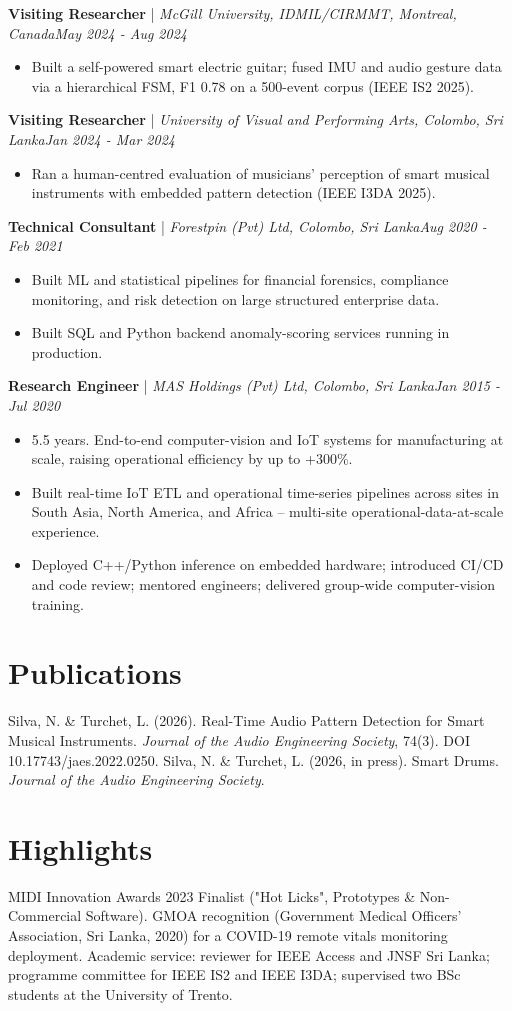 \documentclass[11pt]{article}
\newenvironment{cvrole}[5]{%
  \par\noindent\textbf{\large #1} | \textit{\small #2, #3}\hfill \textit{\small #4 - #5}\par
  \begin{itemize}[leftmargin=2em, itemsep=-0.3em, topsep=-0.5em]%
}{%
  \end{itemize}\par\noindent\mbox{}\par\vspace{0.1em}%
}
\begin{document}
\begin{cvrole}{Visiting Researcher}{McGill University, IDMIL/CIRMMT}{Montreal, Canada}{May 2024}{Aug 2024}
  \item Built a self-powered smart electric guitar; fused IMU and audio gesture data via a hierarchical FSM, F1 0.78 on a 500-event corpus (IEEE IS2 2025).
\end{cvrole}

\begin{cvrole}{Visiting Researcher}{University of Visual and Performing Arts}{Colombo, Sri Lanka}{Jan 2024}{Mar 2024}
  \item Ran a human-centred evaluation of musicians' perception of smart musical instruments with embedded pattern detection (IEEE I3DA 2025).
\end{cvrole}

\begin{cvrole}{Technical Consultant}{Forestpin (Pvt) Ltd}{Colombo, Sri Lanka}{Aug 2020}{Feb 2021}
  \item Built ML and statistical pipelines for financial forensics, compliance monitoring, and risk detection on large structured enterprise data.
  \item Built SQL and Python backend anomaly-scoring services running in production.
\end{cvrole}

\begin{cvrole}{Research Engineer}{MAS Holdings (Pvt) Ltd}{Colombo, Sri Lanka}{Jan 2015}{Jul 2020}
  \item 5.5 years. End-to-end computer-vision and IoT systems for manufacturing at scale, raising operational efficiency by up to +300\%.
  \item Built real-time IoT ETL and operational time-series pipelines across sites in South Asia, North America, and Africa -- multi-site operational-data-at-scale experience.
  \item Deployed C++/Python inference on embedded hardware; introduced CI/CD and code review; mentored engineers; delivered group-wide computer-vision training.
\end{cvrole}

\section*{Publications}
Silva, N. \& Turchet, L. (2026). Real-Time Audio Pattern Detection for Smart Musical Instruments. \textit{Journal of the Audio Engineering Society}, 74(3). DOI 10.17743/jaes.2022.0250. Silva, N. \& Turchet, L. (2026, in press). Smart Drums. \textit{Journal of the Audio Engineering Society}.

\section*{Highlights}
MIDI Innovation Awards 2023 Finalist ("Hot Licks", Prototypes \& Non-Commercial Software). GMOA recognition (Government Medical Officers' Association, Sri Lanka, 2020) for a COVID-19 remote vitals monitoring deployment. Academic service: reviewer for IEEE Access and JNSF Sri Lanka; programme committee for IEEE IS2 and IEEE I3DA; supervised two BSc students at the University of Trento.
\end{document}
